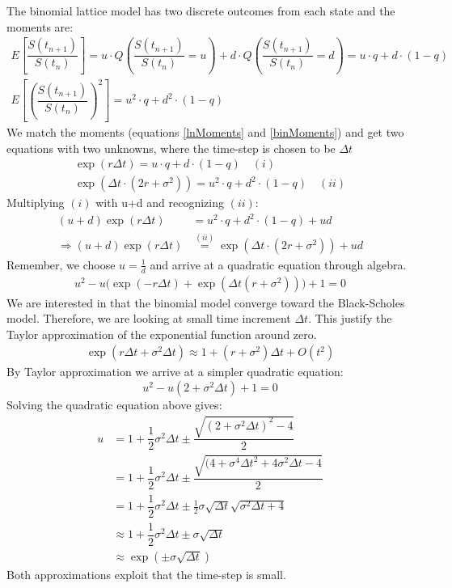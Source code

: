 The binomial lattice model has two discrete outcomes from each state and the moments are:
\begin{equation}\label{binMoments}
\begin{split}
E[\dfrac{S(t_{n+1})}{S(t_{n})}]=u \cdot Q(\dfrac{S(t_{n+1})}{S(t_{n})} = u) + d \cdot Q(\dfrac{S(t_{n+1})}{S(t_{n})} = d) = u \cdot q + d \cdot (1-q)\\
E[(\dfrac{S(t_{n+1})}{S(t_{n})})^2]=u^2 \cdot q + d^2 \cdot (1-q)
\end{split}
\end{equation}
We match the moments (equations \eqref{lnMoments} and \eqref{binMoments}) and get two equations with two unknowns, where the time-step is chosen to be $\Delta t$
\begin{align*}
\exp(r \Delta t)=u \cdot q + d \cdot (1-q) \quad (i)\\
\exp(\Delta t \cdot (2r + \sigma^2))=u^2 \cdot q + d^2 \cdot (1-q) \quad (ii)
\end{align*}
Multiplying $(i)$ with u+d and recognizing $(ii)$:
\begin{align*}
(u+d)\exp(r \Delta t)&=u^2 \cdot q + d^2 \cdot (1-q) + ud\\
\Rightarrow (u+d)\exp(r \Delta t)&\overset{(ii)}{=}\exp(\Delta t \cdot (2r + \sigma^2)) + u d
\end{align*}
Remember, we choose $u= \frac{1}{d}$ and arrive at a quadratic equation through algebra.
\begin{align*}
u^2 - u\bigg(\exp(-r \Delta t) + \exp(\Delta t(r+\sigma^2))\bigg)+1=0
\end{align*}
We are interested in that the binomial model converge toward the Black-Scholes model. Therefore, we are looking at small time increment $\Delta t$. This justify the Taylor approximation of the exponential function around zero.
\begin{align*}
\exp(r \Delta t + \sigma^2 \Delta t) \approx 1 + (r+\sigma^2)\Delta t + O(t^2)
\end{align*}
By Taylor approximation we arrive at a simpler quadratic equation:
\begin{equation*}
u^2-u(2+\sigma^2 \Delta t) + 1 = 0
\end{equation*}
Solving the quadratic equation above gives:
\begin{align*}
u&=1+\dfrac{1}{2} \sigma^2 \Delta t \pm  \dfrac{\sqrt{(2+\sigma^2 \Delta t)^2 - 4}}{2}\\
&=1+\dfrac{1}{2} \sigma^2 \Delta t \pm  \dfrac{\sqrt{(4+\sigma^4 \Delta t^2 + 4 \sigma^2 \Delta t - 4}}{2}\\
&=1+\dfrac{1}{2} \sigma^2 \Delta t \pm \frac{1}{2} \sigma \sqrt{\Delta t} \sqrt{\sigma^2 \Delta t + 4}\\
&\approx 1+\dfrac{1}{2} \sigma^2 \Delta t \pm \sigma \sqrt{\Delta t}\\
&\approx \exp(\pm \sigma \sqrt{\Delta t})
\end{align*}
Both approximations exploit that the time-step is small.
